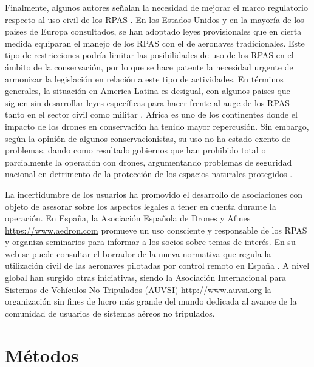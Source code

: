 \documentclass[9t,twocolumn]{article}
\begin{document}
Finalmente, algunos autores señalan la necesidad de mejorar el marco
regulatorio respecto al uso civil de los RPAS \citep{Nugraha2016}. En
los Estados Unidos y en la mayoría de los paises de Europa consultados,
se han adoptado leyes provisionales que en cierta medida equiparan el
manejo de los RPAS con el de aeronaves tradicionales. Este tipo de
restricciones podría limitar las posibilidades de uso de los RPAS en el
ámbito de la conservación, por lo que se hace patente la necesidad
urgente de armonizar la legislación en relación a este tipo de
actividades. En términos generales, la situación en America Latina es
desigual, con algunos paises que siguen sin desarrollar leyes
específicas para hacer frente al auge de los RPAS tanto en el sector
civil como militar \citep{Nacion2013}. Africa es uno de los continentes
donde el impacto de los drones en conservación ha tenido mayor
repercusión. Sin embargo, según la opinión de algunos conservacionistas,
su uso no ha estado exento de problemas, dando como resultado gobiernos
que han prohibido total o parcialmente la operación con drones,
argumentando problemas de seguridad nacional en detrimento de la
protección de los espacios naturales protegidos \citep{Andrews2014}.

La incertidumbre de los usuarios ha promovido el desarrollo de
asociaciones con objeto de asesorar sobre los aspectos legales a tener
en cuenta durante la operación. En España, la Asociación Española de
Drones y Afines \url{https://www.aedron.com} promueve un uso consciente
y responsable de los RPAS y organiza seminarios para informar a los
socios sobre temas de interés. En su web se puede consultar el borrador
de la nueva normativa que regula la utilización civil de las aeronaves
pilotadas por control remoto en España \citep{Aedron2017}. A nivel
global han surgido otras iniciativas, siendo la Asociación Internacional
para Sistemas de Vehículos No Tripulados (AUVSI)
\url{http://www.auvsi.org} la organización sin fines de lucro más grande
del mundo dedicada al avance de la comunidad de usuarios de sistemas
aéreos no tripulados.

\section{Métodos}\label{metodos}
\end{document}
